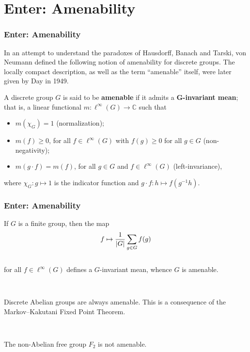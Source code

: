 \documentclass{beamer}
\DeclarePairedDelimiter{\abs}{\lvert}{\rvert}
\theoremstyle{example}
\begin{document}
\section{Enter: Amenability}

\begin{frame}
\frametitle{Enter: Amenability}
In an attempt to understand the paradoxes of Hausdorff, Banach and Tarski, von Neumann defined the following notion of amenability for discrete groups. The locally compact description, as well as the term ``amenable'' itself, were later given by Day in 1949.\\[0.5\baselineskip]%

\begin{definition}[Amenability]
A discrete group $G$ is said to be \textbf{amenable} if it admits a \textbf{$\boldsymbol{G}$-invariant mean}; that is, a linear functional $m : \ell^\infty(G) \to \mathbb{C}$ such that
\begin{itemize}
\item $m(\chi_G) = 1$ (normalization);
\item $m(f) \geq 0$, for all $f \in \ell^\infty(G)$ with $f(g) \geq 0$ for all $g \in G$ (non-negativity);
\item $m(g \cdot f) = m(f)$, for all $g \in G$ and $f \in \ell^\infty(G)$ (left-invariance),
\end{itemize}
where $\chi_G : g \mapsto 1$ is the indicator function and $g \cdot f : h \mapsto f(g^{-1}h)$.
\end{definition}
\end{frame}

\begin{frame}
\frametitle{Enter: Amenability}
\begin{example}
If $G$ is a finite group, then the map\\[-1.5\baselineskip]
\begin{align*}
\begin{split}
f \mapsto \frac{1}{\abs{G}}\sum_{g \in G} f(g)
\end{split}
\end{align*}
\noindent\\[-0.5\baselineskip] for all $f \in \ell^\infty(G)$ defines a $G$-invariant mean, whence $G$ is amenable.
\end{example}
\noindent\\[0.5\baselineskip]
\begin{example}
Discrete Abelian groups are always amenable. This is a consequence of the Markov--Kakutani Fixed Point Theorem.
\end{example}
\noindent\\[0.5\baselineskip]
\begin{example}
The non-Abelian free group $F_2$ is not amenable.
\end{example}
\end{frame}
\end{document}
